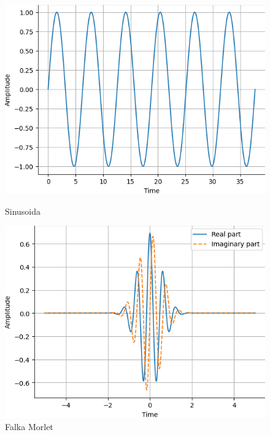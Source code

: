 \begin{figure}[ht]
    \centering
    \begin{minipage}[t]{0.45\linewidth}
        \includegraphics[width=\linewidth]{Rozdziały/02.Podstawy_teoretyczne/Obrazy/sine_wave.png}
        \caption{Sinusoida}
        \label{fig:image27}
    \end{minipage}
    \hspace{0.5cm}
    \begin{minipage}[t]{0.45\linewidth}
        \includegraphics[width=\linewidth]{Rozdziały/02.Podstawy_teoretyczne/Obrazy/morlet_wavelet.png}
        \caption{Falka Morlet}
        \label{fig:image28}
    \end{minipage}
\end{figure}



